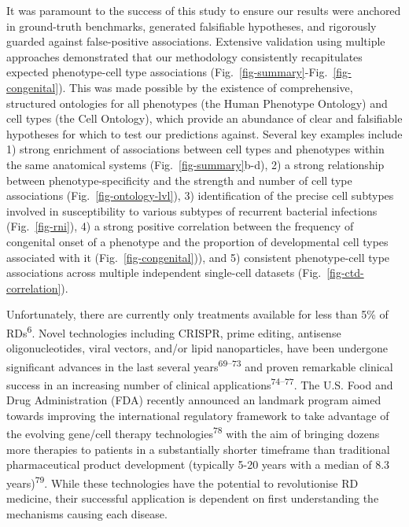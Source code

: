 \documentclass[
]{article}
\begin{document}
It was paramount to the success of this study to ensure our results were
anchored in ground-truth benchmarks, generated falsifiable hypotheses,
and rigorously guarded against false-positive associations. Extensive
validation using multiple approaches demonstrated that our methodology
consistently recapitulates expected phenotype-cell type associations
(Fig.~\ref{fig-summary}-Fig.~\ref{fig-congenital}). This was made
possible by the existence of comprehensive, structured ontologies for
all phenotypes (the Human Phenotype Ontology) and cell types (the Cell
Ontology), which provide an abundance of clear and falsifiable
hypotheses for which to test our predictions against. Several key
examples include 1) strong enrichment of associations between cell types
and phenotypes within the same anatomical systems
(Fig.~\ref{fig-summary}b-d), 2) a strong relationship between
phenotype-specificity and the strength and number of cell type
associations (Fig.~\ref{fig-ontology-lvl}), 3) identification of the
precise cell subtypes involved in susceptibility to various subtypes of
recurrent bacterial infections (Fig.~\ref{fig-rni}), 4) a strong
positive correlation between the frequency of congenital onset of a
phenotype and the proportion of developmental cell types associated with
it (Fig.~\ref{fig-congenital})), and 5) consistent phenotype-cell type
associations across multiple independent single-cell datasets
(Fig.~\ref{fig-ctd-correlation}).

Unfortunately, there are currently only treatments available for less
than 5\% of RDs\textsuperscript{6}. Novel technologies including CRISPR,
prime editing, antisense oligonucleotides, viral vectors, and/or lipid
nanoparticles, have been undergone significant advances in the last
several years\textsuperscript{69--73} and proven remarkable clinical
success in an increasing number of clinical
applications\textsuperscript{74--77}. The U.S. Food and Drug
Administration (FDA) recently announced an landmark program aimed
towards improving the international regulatory framework to take
advantage of the evolving gene/cell therapy
technologies\textsuperscript{78} with the aim of bringing dozens more
therapies to patients in a substantially shorter timeframe than
traditional pharmaceutical product development (typically 5-20 years
with a median of 8.3 years)\textsuperscript{79}. While these
technologies have the potential to revolutionise RD medicine, their
successful application is dependent on first understanding the
mechanisms causing each disease.
\end{document}
